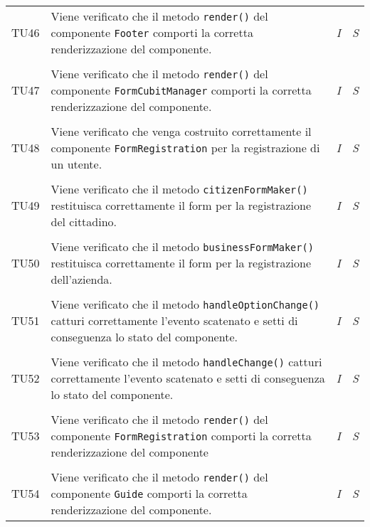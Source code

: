 \begin{longtable}{ >{\centering}p{} >{}p{}
				>{\centering}p{} >{\centering}p{}}
			\tabularnewline
			\hypertarget{TU46}{TU46} & Viene verificato che il metodo 
			\texttt{render()} del componente \texttt{Footer} comporti la 
			corretta renderizzazione del componente. & 
			\textit{I} & 
			\textit{S}\\
			
			\tabularnewline
			\hypertarget{TU47}{TU47} & Viene verificato che il metodo 
			\texttt{render()} del componente \texttt{FormCubitManager} comporti 
			la corretta renderizzazione del componente. & 
			\textit{I} & 
			\textit{S}\\
			
			\tabularnewline
			\hypertarget{TU48}{TU48} & Viene verificato che venga costruito 
			correttamente il componente \texttt{FormRegistration} per la 
			registrazione di un utente. & 
			\textit{I} & 
			\textit{S}\\ 
			
			\tabularnewline
			\hypertarget{TU49}{TU49} & Viene verificato che il metodo 
			\texttt{citizenFormMaker()} restituisca correttamente il form per 
			la registrazione del cittadino. & 
			\textit{I} & 
			\textit{S}\\
			
			\tabularnewline
			\hypertarget{TU50}{TU50} & Viene verificato che il metodo 
			\texttt{businessFormMaker()} restituisca correttamente il form per  
			la registrazione dell'azienda. & 
			\textit{I} & 
			\textit{S}\\        
			     
			\tabularnewline
			\hypertarget{TU51}{TU51} & Viene verificato che il metodo 
			\texttt{handleOptionChange()} catturi correttamente l'evento scatenato 
			e setti di conseguenza lo stato del componente. & 
			\textit{I} & 
			\textit{S}\\        
						     
			\tabularnewline
			\hypertarget{TU52}{TU52} & Viene verificato che il metodo 
			\texttt{handleChange()} catturi correttamente l'evento scatenato e setti 
			di conseguenza lo stato del componente. & 
			\textit{I} & 
			\textit{S}\\        
						     
			\tabularnewline
			\hypertarget{TU53}{TU53} & Viene verificato che il metodo 
			\texttt{render()} del componente \texttt{FormRegistration} comporti la 
			corretta renderizzazione del componente & 
			\textit{I} & 
			\textit{S}\\        
						     
			\tabularnewline
			\hypertarget{TU54}{TU54} & Viene verificato che il metodo 
			\texttt{render()} del componente \texttt{Guide} comporti la corretta 
			renderizzazione del componente. & 
			\textit{I} & 
			\textit{S}\\        
						     

\end{longtable}
